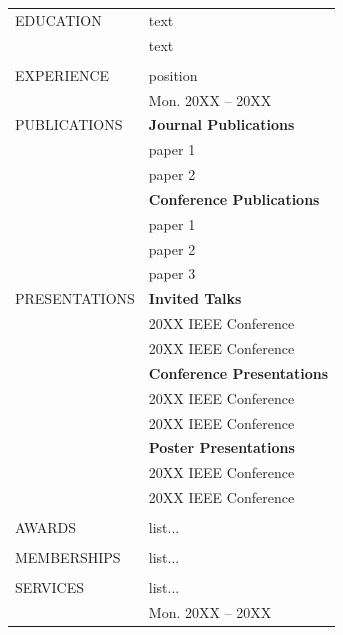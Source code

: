\documentclass[oneside,openany]{report}
\begin{document}
\begin{singlespace}
\begin{longtable}{p{} p{}} 
		EDUCATION    & text \\
		
		& text
		\\\\
		
		EXPERIENCE   & position\\ &\hfill Mon. 20XX -- 20XX \\

		
		PUBLICATIONS & \textbf{Journal Publications}\\

		& paper 1 \vspace{0.05in}\\
		& paper 2 \vspace{0.15in}\\


		& \textbf{Conference Publications}\\
		& paper 1 \vspace{0.05in}\\
		& paper 2 \vspace{0.05in}\\
		& paper 3 \vspace{0.15in}\\
		
		PRESENTATIONS
		& \textbf{Invited Talks}\\
		& 20XX IEEE Conference \vspace{0.05in}\\
		& 20XX IEEE Conference
		\vspace{0.15in}\\
		
		& \textbf{Conference Presentations}\\
		& 20XX IEEE Conference \vspace{0.05in}\\
		& 20XX IEEE Conference
		\vspace{0.15in}\\
		
		& \textbf{Poster Presentations}\\
		& 20XX IEEE Conference \vspace{0.05in}\\
		& 20XX IEEE Conference
		\vspace{0.15in}
		\\\\
		
		AWARDS    
		& list... \vspace{0.05in}
		\\\\
		
		MEMBERSHIPS    
		& list...
		\\\\
		
		SERVICES    
		& list... \\&\hfill Mon. 20XX -- 20XX \\
\end{longtable}\addtocounter{table}{-1}
\end{singlespace}
\end{document}
